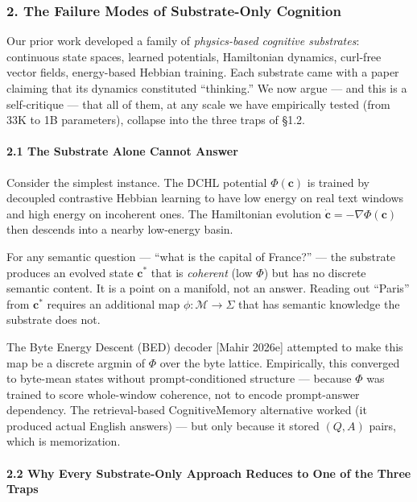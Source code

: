 \documentclass[
  11pt,
  a4paper,
]{article}
\begin{document}
\subsubsection{2. The Failure Modes of Substrate-Only
Cognition}\label{the-failure-modes-of-substrate-only-cognition}

Our prior work developed a family of \emph{physics-based cognitive
substrates}: continuous state spaces, learned potentials, Hamiltonian
dynamics, curl-free vector fields, energy-based Hebbian training. Each
substrate came with a paper claiming that its dynamics constituted
``thinking.'' We now argue --- and this is a self-critique --- that all
of them, at any scale we have empirically tested (from 33K to 1B
parameters), collapse into the three traps of §1.2.

\paragraph{2.1 The Substrate Alone Cannot
Answer}\label{the-substrate-alone-cannot-answer}

Consider the simplest instance. The DCHL potential \(\Phi(\mathbf{c})\)
is trained by decoupled contrastive Hebbian learning to have low energy
on real text windows and high energy on incoherent ones. The Hamiltonian
evolution \(\dot{\mathbf{c}} = -\nabla\Phi(\mathbf{c})\) then descends
into a nearby low-energy basin.

For any semantic question --- ``what is the capital of France?'' --- the
substrate produces an evolved state \(\mathbf{c}^*\) that is
\emph{coherent} (low \(\Phi\)) but has no discrete semantic content. It
is a point on a manifold, not an answer. Reading out ``Paris'' from
\(\mathbf{c}^*\) requires an additional map
\(\phi: \mathcal{M} \to \Sigma\) that has semantic knowledge the
substrate does not.

The Byte Energy Descent (BED) decoder {[}Mahir 2026e{]} attempted to
make this map be a discrete argmin of \(\Phi\) over the byte lattice.
Empirically, this converged to byte-mean states without
prompt-conditioned structure --- because \(\Phi\) was trained to score
whole-window coherence, not to encode prompt-answer dependency. The
retrieval-based CognitiveMemory alternative worked (it produced actual
English answers) --- but only because it stored \((Q, A)\) pairs, which
is memorization.

\paragraph{2.2 Why Every Substrate-Only Approach Reduces to One of the
Three
Traps}\label{why-every-substrate-only-approach-reduces-to-one-of-the-three-traps}
\end{document}
